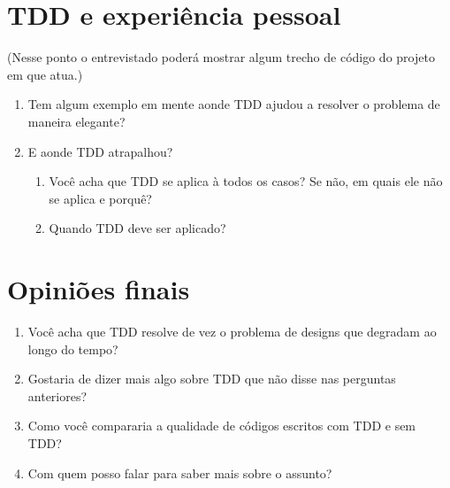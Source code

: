 \section{TDD e experiência pessoal}

(Nesse ponto o entrevistado poderá mostrar algum trecho de código do projeto em que atua.)

\begin{enumerate}
	\item Tem algum exemplo em mente aonde TDD ajudou a resolver o problema de
	maneira elegante?

	\item E aonde TDD atrapalhou?
		\begin{enumerate}
			\item Você acha que TDD se aplica à todos os casos? Se não, em quais ele não 
			se aplica e porquê?

			\item Quando TDD deve ser aplicado?
		\end{enumerate}

\end{enumerate}

\section{Opiniões finais}

\begin{enumerate}
	\item Você acha que TDD resolve de vez o problema de designs que degradam ao longo do tempo?

	\item Gostaria de dizer mais algo sobre TDD que não disse nas perguntas anteriores?
	
	\item Como você compararia a qualidade de códigos escritos com TDD e sem TDD? 

	\item Com quem posso falar para saber mais sobre o assunto?
\end{enumerate}

